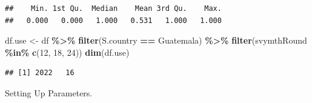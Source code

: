 \documentclass[
]{book}
\newenvironment{Shaded}{\begin{snugshade}}{\end{snugshade}}
\newcommand{\DecValTok}[1]{\textcolor[rgb]{0.00,0.00,0.81}{#1}}
\newcommand{\KeywordTok}[1]{\textcolor[rgb]{0.13,0.29,0.53}{\textbf{#1}}}
\newcommand{\NormalTok}[1]{#1}
\newcommand{\OperatorTok}[1]{\textcolor[rgb]{0.81,0.36,0.00}{\textbf{#1}}}
\newcommand{\StringTok}[1]{\textcolor[rgb]{0.31,0.60,0.02}{#1}}
\begin{document}
\begin{Shaded}
\end{Shaded}

\begin{verbatim}
##    Min. 1st Qu.  Median    Mean 3rd Qu.    Max. 
##   0.000   0.000   1.000   0.531   1.000   1.000
\end{verbatim}

\begin{Shaded}
\begin{Highlighting}[]
\NormalTok{df.use \textless{}{-}}\StringTok{ }\NormalTok{df }\OperatorTok{\%\textgreater{}\%}\StringTok{ }\KeywordTok{filter}\NormalTok{(S.country }\OperatorTok{==}\StringTok{ \textquotesingle{}Guatemala\textquotesingle{}}\NormalTok{) }\OperatorTok{\%\textgreater{}\%}
\StringTok{  }\KeywordTok{filter}\NormalTok{(svymthRound }\OperatorTok{\%in\%}\StringTok{ }\KeywordTok{c}\NormalTok{(}\DecValTok{12}\NormalTok{, }\DecValTok{18}\NormalTok{, }\DecValTok{24}\NormalTok{))}
\KeywordTok{dim}\NormalTok{(df.use)}
\end{Highlighting}
\end{Shaded}

\begin{verbatim}
## [1] 2022   16
\end{verbatim}

Setting Up Parameters.
\end{document}
